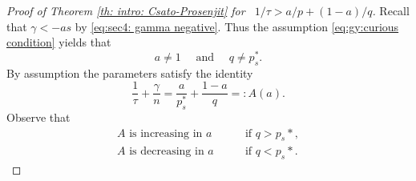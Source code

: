 \documentclass[reqno,12pt]{amsart}
\numberwithin{equation}{section}
\theoremstyle{plain}
\theoremstyle{definition}
\begin{document}
\begin{proof}[Proof of Theorem \ref{th: intro: Csato-Prosenjit} for ~$1/\tau>a/p+(1-a)/q$]
Recall that $\gamma<-as$ by \eqref{eq:sec4: gamma negative}. Thus the assumption \eqref{eq:gy:curious condition} yields that
$$
    a\neq 1\quad\text{ and }\quad q\neq p_s^*. 
$$ 
By assumption the parameters satisfy the identity
\begin{equation}
    \label{th: end part of the main theorem}
     \frac{1}{\tau} + \frac{\gamma}{n} = \frac{a}{p_s^{*}} + \frac{1-a}{q} =: A(a).
\end{equation}
Observe that
\begin{equation}
  \label{eq:A decreasing}
   \begin{split}
              A\text{ is increasing in $a$ }\quad &\text{ if $q>p_s*$},
             \\ 
             A\text{ is decreasing in $a$ }\quad &\text{ if $q<p_s*$}.
    \end{split}
\end{equation} 
 

\end{proof}
\end{document}
